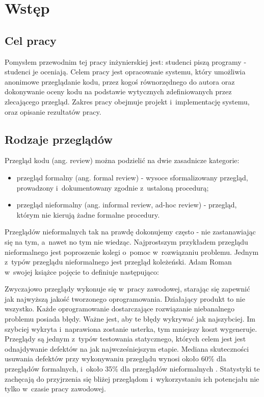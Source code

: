 \chapter{Wstęp}

\section{Cel pracy}
Pomysłem przewodnim tej pracy inżynierskiej jest: studenci piszą programy - studenci je oceniają. Celem pracy jest opracowanie systemu, który umożliwia anonimowe przeglądanie kodu, przez kogoś równorzędnego do autora oraz dokonywanie oceny kodu na podstawie wytycznych zdefiniowanych przez zlecającego przegląd. Zakres pracy obejmuje projekt i~implementację systemu, oraz opisanie rezultatów pracy.

\section{Rodzaje przeglądów}
Przegląd kodu (ang. review) można podzielić na dwie zasadnicze kategorie:

\begin{itemize}
\item przegląd formalny (ang. formal review) - wysoce sformalizowany przegląd, prowadzony i~dokumentowany zgodnie z~ustaloną procedurą;
\item przegląd nieformalny (ang. informal review, ad-hoc review) - przegląd, którym nie kierują żadne formalne procedury.
\end{itemize}

Przeglądów nieformalnych tak na prawdę dokonujemy często - nie zastanawiając się na tym, a~nawet no tym nie wiedząc. Najprostszym przykładem przeglądu nieformalnego jest poproszenie kolegi o~pomoc w~rozwiązaniu problemu. Jednym z~typów przeglądu nieformalnego jest przegląd koleżeński. Adam Roman w~swojej książce pojęcie to definiuje następująco:

\medskip
{} \cite{TestPWN}

\medskip
Zwyczajowo przeglądy wykonuje się w~pracy zawodowej, starając się zapewnić jak najwyższą jakość tworzonego oprogramowania. Działający produkt to nie wszystko. Każde oprogramowanie dostarczające rozwiązanie niebanalnego problemu posiada błędy. Ważne jest, aby te błędy wykrywać jak najszybciej. Im szybciej wykryta i~naprawiona zostanie usterka, tym mniejszy koszt wygeneruje. Przeglądy są jednym z~typów testowania statycznego, których celem jest jest odnajdywanie defektów na jak najwcześniejszym etapie. Mediana skuteczności usuwania defektów przy wykonywaniu przeglądu wynosi około 60\% dla przeglądów formalnych, i~około 35\% dla przeglądów nieformalnych \cite{TestPWN}. Statystyki te zachęcają do przyjrzenia się bliżej przeglądom i~wykorzystaniu ich potencjału nie tylko w~czasie pracy zawodowej.

